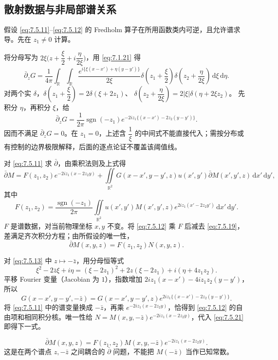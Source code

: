 \documentclass[lang=cn,scheme=chinese,mode=simple,device=normal,color=blue,math=cm,thmcnt=section,12pt]{elegantbook}
\newcommand{\dd}{\,\mathrm{d}}
\newcommand{\eqq}[2]{\tag{#1}\label{eq:#1}#2}
\DeclareMathOperator{\sgn}{sgn}
\begin{document}
\subsection{散射数据与非局部谱关系}
假设 \eqref{eq:7.5.11}--\eqref{eq:7.5.12} 的 Fredholm 算子在所用函数类内可逆，且允许谱求导。先在 $z_1\ne0$ 计算。
\begin{callout}
将分母写为 $2\xi\bigl(z+\dfrac{\xi}{2}+i\dfrac{\eta}{2\xi}\bigr)$，用 \eqref{eq:7.1.21} 得
\[
\bar\partial_zG=\dfrac{1}{4\pi}\int_{\mathbb R}\int_{\mathbb R}
\dfrac{e^{i\{\xi(x-x')+\eta(y-y')\}}}{2\xi}
\delta(z_1+\dfrac{\xi}{2})\delta(z_2+\dfrac{\eta}{2\xi})\dd\xi\dd\eta.
\]
对两个实 $\delta$，$\delta(z_1+\dfrac{\xi}{2})=2\delta(\xi+2z_1)$、
$\delta(z_2+\dfrac{\eta}{2\xi})=2|\xi|\delta(\eta+2\xi z_2)$。
先积分 $\eta$，再积分 $\xi$，给
\[
\bar\partial_zG=\dfrac{1}{2\pi}\sgn(-z_1)
e^{-2iz_1\{(x-x')-2z_2(y-y')\}}.
\]
因而不满足 $\bar\partial_zG=0$。在 $z_1=0$，上述含 $\dfrac{1}{\xi}$ 的中间式不能直接代入；需按分布或有控制的边界极限解释，后面的逐点论证不覆盖该阈值线。
\end{callout}
对 \eqref{eq:7.5.11} 求 $\bar\partial$，由乘积法则及上式得
\begin{equation}
\eqq{7.5.19}{\bar\partial M=F(z_1,z_2)e^{-2iz_1(x-2z_2y)}
+\iint\limits_{\mathbb R^2}G(x-x',y-y',z)u(x',y')\bar\partial M(x',y',z)\dd x'\dd y',}
\end{equation}
其中
\begin{equation}
\eqq{7.5.20}{F(z_1,z_2)=\dfrac{\sgn(-z_1)}{2\pi}\iint\limits_{\mathbb R^2}
u(x',y')M(x',y',z)e^{2iz_1(x'-2z_2y')}\dd x'\dd y'.}
\end{equation}
$F$ 是谱数据，对当前物理坐标 $x,y$ 不变。将 \eqref{eq:7.5.12} 乘 $F$ 后减去 \eqref{eq:7.5.19}，差满足齐次积分方程；由所假设的唯一性，
\begin{equation}
\eqq{7.5.21}{\bar\partial M(x,y,z)=F(z_1,z_2)N(x,y,z).}
\end{equation}
\begin{callout}
对 \eqref{eq:7.5.13} 中 $z\mapsto-\bar z$，用分母恒等式
\[
\xi^2-2\bar z\xi+i\eta=(\xi-2z_1)^2+2z(\xi-2z_1)+i(\eta+4z_1z_2).
\]
平移 Fourier 变量（Jacobian 为 $1$），指数增加
$2iz_1(x-x')-4iz_1z_2(y-y')$，所以
\[
G(x-x',y-y',-\bar z)=G(x-x',y-y',z)e^{2iz_1\{(x-x')-2z_2(y-y')\}}.
\]
将 \eqref{eq:7.5.11} 中的谱变量换成 $-\bar z$，再乘 $e^{-2iz_1(x-2z_2y)}$，恰得到 \eqref{eq:7.5.12} 的自由项和相同积分核。唯一性给
$N=M(x,y,-\bar z)e^{-2iz_1(x-2z_2y)}$，代入 \eqref{eq:7.5.21} 即得下一式。
\end{callout}
\begin{equation}
\eqq{7.5.22}{\bar\partial M(x,y,z)=F(z_1,z_2)M(x,y,-\bar z)e^{-2iz_1(x-2z_2y)}.}
\end{equation}
这是在两个谱点 $z,-\bar z$ 之间耦合的 $\bar\partial$ 问题，不能把 $M(-\bar z)$ 当作已知常数。
\end{document}

